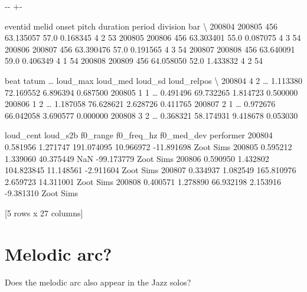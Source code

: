 \documentclass[letterpaper,10pt,english]{sphinxmanual}
\newlength\nbsphinxcodecellspacing
\begin{document}
{

\kern-\sphinxverbatimsmallskipamount\kern-\baselineskip
\kern+\FrameHeightAdjust\kern-\fboxrule
\vspace{\nbsphinxcodecellspacing}

\begin{sphinxVerbatim}[commandchars=\\\{\}]
\llap{\color{nbsphinxout}[17]:\,\hspace{\fboxrule}\hspace{\fboxsep}}        eventid  melid      onset  pitch  duration  period  division  bar  \textbackslash{}
200804   200805    456  63.135057   57.0  0.168345       4         2   53
200805   200806    456  63.303401   55.0  0.087075       4         3   54
200806   200807    456  63.390476   57.0  0.191565       4         3   54
200807   200808    456  63.640091   59.0  0.406349       4         1   54
200808   200809    456  64.058050   52.0  1.433832       4         2   54

        beat  tatum  {\ldots}  loud\_max   loud\_med   loud\_sd loud\_relpos  \textbackslash{}
200804     4      2  {\ldots}  1.113380  72.169552  6.896394    0.687500
200805     1      1  {\ldots}  0.491496  69.732265  1.814723    0.500000
200806     1      2  {\ldots}  1.187058  76.628621  2.628726    0.411765
200807     2      1  {\ldots}  0.972676  66.042058  3.690577    0.000000
200808     3      2  {\ldots}  0.368321  58.174931  9.418678    0.053030

        loud\_cent  loud\_s2b    f0\_range  f0\_freq\_hz  f0\_med\_dev  performer
200804   0.581956  1.271747  191.074095   10.966972  -11.891698  Zoot Sims
200805   0.595212  1.339060   40.375449         NaN  -99.173779  Zoot Sims
200806   0.590950  1.432802  104.823845   11.148561   -2.911604  Zoot Sims
200807   0.334937  1.082549  165.810976    2.659723   14.311001  Zoot Sims
200808   0.400571  1.278890   66.932198    2.153916   -9.381310  Zoot Sims

[5 rows x 27 columns]
\end{sphinxVerbatim}
}


\section{Melodic arc?}
\label{\detokenize{04_jazz_solos:Melodic-arc?}}
Does the melodic arc also appear in the Jazz solos?
\end{document}
